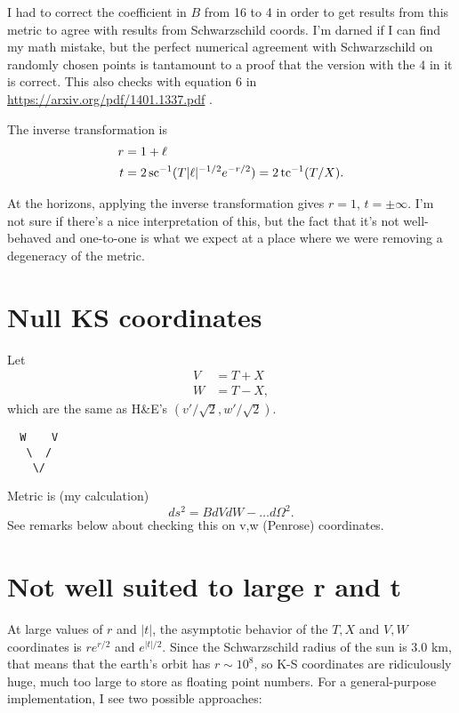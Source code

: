 \documentclass{article}
\begin{document}
I had to correct the coefficient in $B$ from 16 to 4
in order to get results from this metric to agree with results from Schwarzschild coords.
I'm darned if I can find my math mistake, but the perfect numerical agreement with
Schwarzschild on randomly chosen points is tantamount to a proof that the version with
the 4 in it is correct. This also checks with equation 6 in \url{https://arxiv.org/pdf/1401.1337.pdf} .

The inverse transformation is
\begin{align}
  r &= 1+\ell  \\
  t &= 2\operatorname{sc}^{-1}(T|\ell |^{-1/2}e^{-r/2}) = 2\operatorname{tc}^{-1}(T/X).
\end{align}

At the horizons, applying the inverse transformation gives $r=1$, $t=\pm\infty$. I'm not
sure if there's a nice interpretation of this, but the fact that it's not well-behaved
and one-to-one is what we expect at a place where we were removing a degeneracy of the metric.

\section{Null KS coordinates}

Let
\begin{align}
  V &= T+X\\
  W &= T-X,
\end{align}
which are the same as H\&E's $(v'/\sqrt2,w'/\sqrt2)$.
\begin{verbatim}
  W    V
   \  /
    \/
\end{verbatim}
Metric is (my calculation)
\begin{equation}
  ds^2 = B dVdW-\ldots d\Omega^2.
\end{equation}
See remarks below about checking this on v,w (Penrose) coordinates.

\section{Not well suited to large r and t}

At large values of $r$ and $|t|$, the asymptotic behavior of the $T,X$ and $V,W$ coordinates
is $re^{r/2}$ and $e^{|t|/2}$. Since the Schwarzschild radius of the sun is 3.0 km, that means
that the earth's orbit has $r\sim 10^8$, so K-S coordinates are ridiculously huge, much too
large to store as floating point numbers. For a general-purpose implementation, I see two possible
approaches:
\end{document}
